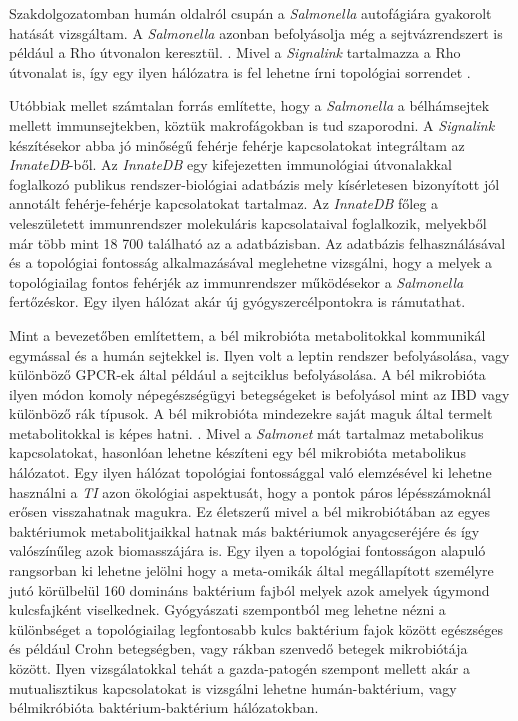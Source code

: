 \documentclass[a4paper,12pt]{article}
\begin{document}
		Szakdolgozatomban humán oldalról csupán a \textit{Salmonella} autofágiára gyakorolt hatását vizsgáltam. A \textit{Salmonella} azonban befolyásolja még a sejtvázrendszert is például a Rho útvonalon keresztül. \cite{salmonella_and_host_cell_nature} \cite{salmonella_autophagy_nature_old}. Mivel a \textit{Signalink} tartalmazza a Rho útvonalat is, így egy ilyen hálózatra is fel lehetne írni topológiai sorrendet .
		
		Utóbbiak mellet számtalan forrás \cite{salmonella_and_host_cell_nature} \cite{salmonella_autophagy_nature_old} \cite{hilD} említette, hogy a \textit{Salmonella} a bélhámsejtek mellett immunsejtekben, köztük makrofágokban is tud szaporodni. A \textit{Signalink} készítésekor abba jó minőségű fehérje fehérje kapcsolatokat integráltam az \textit{InnateDB}-ből. Az \textit{InnateDB} egy kifejezetten immunológiai útvonalakkal foglalkozó publikus rendszer-biológiai adatbázis mely kísérletesen bizonyított jól annotált fehérje-fehérje kapcsolatokat tartalmaz. Az \textit{InnateDB} főleg a veleszületett immunrendszer molekuláris kapcsolataival foglalkozik, melyekből már több mint 18 700 található az a adatbázisban. \cite{innatedb} Az adatbázis felhasználásával és a topológiai fontosság alkalmazásával meglehetne vizsgálni, hogy a melyek a topológiailag fontos fehérjék az immunrendszer működésekor a \textit{Salmonella} fertőzéskor. Egy ilyen hálózat akár új gyógyszercélpontokra is rámutathat.
		
		Mint a bevezetőben említettem, a bél mikrobióta metabolitokkal kommunikál egymással és a humán sejtekkel is. Ilyen volt a leptin rendszer befolyásolása, vagy különböző GPCR-ek által például a sejtciklus befolyásolása. \cite{buthyrate_immune} A bél mikrobióta ilyen módon komoly népegészségügyi betegségeket is befolyásol mint az IBD vagy különböző rák típusok. \cite{gut_microbiome} A bél mikrobióta mindezekre saját maguk által termelt metabolitokkal is képes hatni. \cite{scfa_and_vitamine}. Mivel a \textit{Salmonet} mát tartalmaz metabolikus kapcsolatokat, hasonlóan lehetne készíteni egy bél mikrobióta metabolikus hálózatot. Egy ilyen hálózat topológiai fontossággal való elemzésével ki lehetne használni a \textit{TI} azon ökológiai aspektusát, hogy a pontok páros lépésszámoknál erősen visszahatnak magukra. Ez életszerű mivel a bél mikrobiótában az egyes baktériumok metabolitjaikkal hatnak más baktériumok anyagcseréjére és így valószínűleg azok biomasszájára is. \cite{gut_microbiome} Egy ilyen a topológiai fontosságon alapuló rangsorban ki lehetne jelölni hogy a meta-omikák által megállapított személyre jutó körülbelül 160 domináns baktérium fajból \cite{meta_omics} melyek azok amelyek úgymond kulcsfajként viselkednek. Gyógyászati szempontból meg lehetne nézni a különbséget a topológiailag legfontosabb kulcs baktérium fajok között egészséges és például Crohn betegségben, vagy rákban szenvedő betegek mikrobiótája között. Ilyen vizsgálatokkal tehát a gazda-patogén szempont mellett akár a mutualisztikus kapcsolatokat is vizsgálni lehetne humán-baktérium, vagy bélmikróbióta baktérium-baktérium hálózatokban.
 
\end{document}
